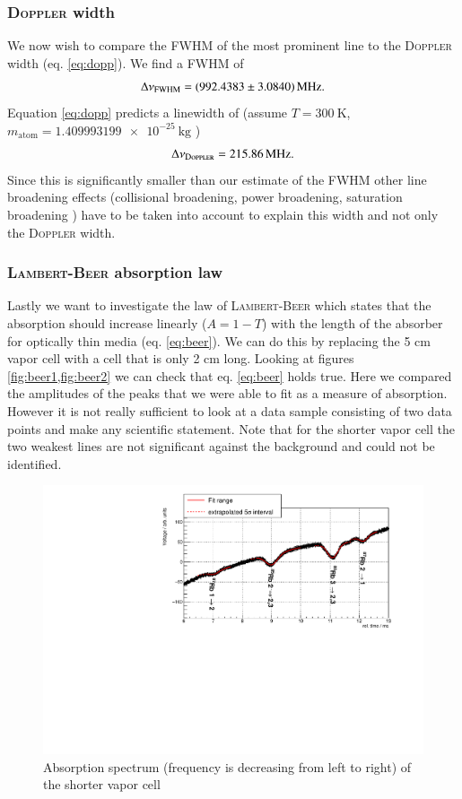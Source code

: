 \documentclass[11pt,a4paper,notitlepage]{scrartcl}
\begin{document}
 
\subsubsection{\textsc{Doppler} width}
We now wish to compare the FWHM of the most prominent line to the \textsc{Doppler} width (eq. \eqref{eq:dopp}). We find a FWHM of $$\Delta\nu_\text{FWHM}=\SI{992.4383\pm3.0840}{\mega\Hz}.$$
Equation \eqref{eq:dopp} predicts a linewidth of (assume $T=\SI{300}{\K}$, $m_\text{atom}=\SI{1.409 993 199e-25}{\kilo\g}$ \cite{85})
$$\Delta\nu_\text{\textsc{Doppler}}=\SI{215.86}{\mega\Hz}.$$
Since this is significantly smaller than our estimate of the FWHM other line broadening effects (collisional broadening, power broadening, saturation broadening \cite{demtröderl}) have to be taken into account to explain this width and not only the \textsc{Doppler} width.
\subsubsection{\textsc{Lambert-Beer} absorption law}
Lastly we want to investigate the law of \textsc{Lambert-Beer} which states that the absorption should increase linearly ($A=1-T$) with the length of the absorber for optically thin media (eq. \eqref{eq:beer}). We can do this by replacing the 5 cm vapor cell with a cell that is only 2 cm long. Looking at figures \cref{fig:beer1,fig:beer2} we can check that eq. \eqref{eq:beer} holds true. Here we compared the amplitudes of the peaks that we were able to fit as a measure of absorption. However it is not really sufficient to look at a data sample consisting of two data points and make any scientific statement. Note that for the shorter vapor cell the two weakest lines are not significant against the background and could not be identified.
\begin{figure}[H]
	\centering
	\includegraphics[width=\linewidth]{figs/measurements/short.pdf}

	\caption{Absorption spectrum (frequency is decreasing from left to right) of the shorter vapor cell}
	\label{fig:beer1}
\end{figure}
\end{document}
